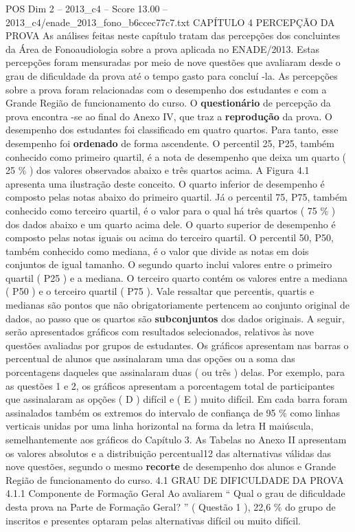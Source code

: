 \begin{textsample}{POS Dim 2 – 2013\_c4 – Score 13.00 – 2013\_c4/enade\_2013\_fono\_b6ccec77c7.txt}  \label{ex:f2_pos_064}
CAPÍTULO 4 PERCEPÇÃO DA PROVA As análises feitas neste capítulo tratam das percepções dos concluintes da Área de Fonoaudiologia sobre a prova aplicada no ENADE/2013.
Estas percepções foram mensuradas por meio de nove questões que avaliaram desde o grau de dificuldade da prova até o tempo gasto para concluí -la.
As percepções sobre a prova foram relacionadas com o desempenho dos estudantes e com a Grande Região de funcionamento do curso.
O \textbf{questionário} de percepção da prova encontra -se ao final do Anexo IV, que traz a \textbf{reprodução} da prova.
O desempenho dos estudantes foi classificado em quatro quartos.
Para tanto, esse desempenho foi \textbf{ordenado} de forma ascendente.
O percentil 25, P25, também conhecido como primeiro quartil, é a nota de desempenho que deixa um quarto ( 25 \% ) dos valores observados abaixo e três quartos acima.
A Figura 4.1 apresenta uma ilustração deste conceito.
O quarto inferior de desempenho é composto pelas notas abaixo do primeiro quartil.
Já o percentil 75, P75, também conhecido como terceiro quartil, é o valor para o qual há três quartos ( 75 \% ) dos dados abaixo e um quarto acima dele.
O quarto superior de desempenho é composto pelas notas iguais ou acima do terceiro quartil.
O percentil 50, P50, também conhecido como mediana, é o valor que divide as notas em dois conjuntos de igual tamanho.
O segundo quarto inclui valores entre o primeiro quartil ( P25 ) e a mediana.
O terceiro quarto contém os valores entre a mediana ( P50 ) e o terceiro quartil ( P75 ).
Vale ressaltar que percentis, quartis e medianas são pontos que não obrigatoriamente pertencem ao conjunto original de dados, ao passo que os quartos são \textbf{subconjuntos} dos dados originais.
A seguir, serão apresentados gráficos com resultados selecionados, relativos às nove questões avaliadas por grupos de estudantes.
Os gráficos apresentam nas barras o percentual de alunos que assinalaram uma das opções ou a soma das porcentagens daqueles que assinalaram duas ( ou três ) delas.
Por exemplo, para as questões 1 e 2, os gráficos apresentam a porcentagem total de participantes que assinalaram as opções ( D ) difícil e ( E ) muito difícil.
Em cada barra foram assinalados também os extremos do intervalo de confiança de 95 \% como linhas verticais unidas por uma linha horizontal na forma da letra H maiúscula, semelhantemente aos gráficos do Capítulo 3.
As Tabelas no Anexo II apresentam os valores absolutos e a distribuição percentual12 das alternativas válidas das nove questões, segundo o mesmo \textbf{recorte} de desempenho dos alunos e Grande Região de funcionamento do curso. 4.1 GRAU DE DIFICULDADE DA PROVA 4.1.1 Componente de Formação Geral Ao avaliarem “ Qual o grau de dificuldade desta prova na Parte de Formação Geral? ” ( Questão 1 ), 22,6 \% do grupo de inscritos e presentes optaram pelas alternativas difícil ou muito difícil.

\end{textsample}
